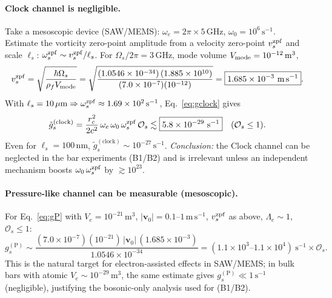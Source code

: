 \documentclass[aps,prb,preprint,amsmath,amssymb]{revtex4-2} %
\newcommand{\rc}{r_c}
\newcommand{\rhoF}{\rho_{f}}
\begin{document}
    \paragraph*{Clock channel is negligible.}
        Take a mesoscopic device (SAW/MEMS): \(\omega_e=2\pi\times 5\,\mathrm{GHz}\), \(\omega_0=10^{6}\,\mathrm{s^{-1}}\).
        Estimate the vorticity zero-point amplitude from a velocity zero-point \(v_{s}^{\rm zpf}\) and scale \(\ell_s\): \(\omega_{s}^{\rm zpf}\sim v_{s}^{\rm zpf}/\ell_s\).
        For \(\Omega_s/2\pi=3\,\mathrm{GHz}\), mode volume \(V_{\rm mode}=10^{-12}\,\mathrm{m^3}\),
        \[
            v_{s}^{\rm zpf}=
            \sqrt{\frac{\hbar \Omega_s}{\rhoF V_{\rm mode}}}
            =\sqrt{\frac{(1.0546\times10^{-34})\,(1.885\times10^{10})}{(7.0\times10^{-7})(10^{-12})}}
            =\boxed{1.685\times10^{-3}\ \mathrm{m\,s^{-1}}}.
        \]
        With \(\ell_s=10\,\mu\mathrm m\Rightarrow \omega_{s}^{\rm zpf}\approx 1.69\times10^{2}\,\mathrm{s^{-1}}\), Eq.~\eqref{eq:gclock} gives
        \[
            \tilde g_{s}^{(\text{clock})}
            =\frac{\rc^2}{2c^2}\,\omega_e\,\omega_0\,\omega_{s}^{\rm zpf}\,\mathcal O_s
            \lesssim \boxed{5.8\times10^{-29}\ \mathrm{s^{-1}}}\quad(\mathcal O_s\le 1).
        \]
        Even for \(\ell_s=100\,\mathrm{nm}\), \(\tilde g_{s}^{(\text{clock})}\sim 10^{-27}\,\mathrm{s^{-1}}\). \emph{Conclusion:} the Clock channel can be neglected in the bar experiments (B1/B2) and is irrelevant unless an independent mechanism boosts \(\omega_0\,\omega_{s}^{\rm zpf}\) by \(\gtrsim 10^{23}\).

    \paragraph*{Pressure-like channel can be measurable (mesoscopic).}
        For Eq.~\eqref{eq:gP} with \(V_e=10^{-21}\,\mathrm{m^3}\), \(|\mathbf v_0|=0.1\text{–}1\,\mathrm{m\,s^{-1}}\), \(v_{s}^{\rm zpf}\) as above, \(\Lambda_e\sim 1\), \(\mathcal O_s\le 1\):
        \[
            g_s^{(\mathrm P)}\sim \frac{(7.0\times10^{-7})(10^{-21})\,|\mathbf v_0|\,(1.685\times10^{-3})}{1.0546\times10^{-34}}
            =\boxed{(1.1\times10^{3}\text{–}1.1\times10^{4})\ \mathrm{s^{-1}}}\times \mathcal O_s.
        \]
        This is the natural target for electron-assisted effects in SAW/MEMS; in bulk bars with atomic \(V_e\sim10^{-29}\,\mathrm{m^3}\), the same estimate gives \(g_s^{(\mathrm P)}\ll 1\,\mathrm{s^{-1}}\) (negligible), justifying the bosonic-only analysis used for (B1/B2).
\end{document}
